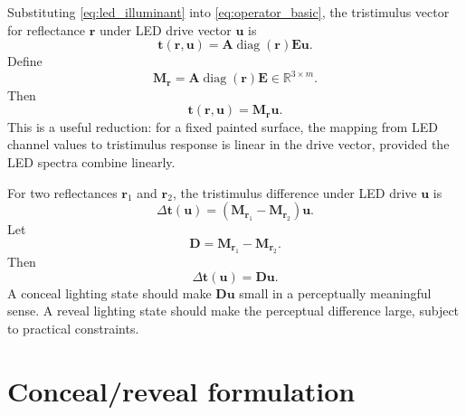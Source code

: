 \documentclass[11pt,a4paper]{article}
\newcommand{\R}{\mathbb{R}}
\newcommand{\diag}{\operatorname{diag}}
\newcommand{\vect}[1]{\boldsymbol{#1}}
\newcommand{\mat}[1]{\mathbf{#1}}
\begin{document}
Substituting \cref{eq:led_illuminant} into \cref{eq:operator_basic}, the tristimulus vector for reflectance $\vect{r}$ under LED drive vector $\vect{u}$ is
\begin{equation}
 \vect{t}(\vect{r},\vect{u})
 =\mat{A}\diag(\vect{r})\mat{E}\vect{u}.
 \label{eq:paint_led_response}
\end{equation}
Define
\begin{equation}
 \mat{M}_{\vect{r}}=\mat{A}\diag(\vect{r})\mat{E}\in\R^{3\times m}.
 \label{eq:paint_response_matrix}
\end{equation}
Then
\begin{equation}
 \vect{t}(\vect{r},\vect{u})=\mat{M}_{\vect{r}}\vect{u}.
 \label{eq:paint_response_linear}
\end{equation}
This is a useful reduction: for a fixed painted surface, the mapping from LED channel values to tristimulus response is linear in the drive vector, provided the LED spectra combine linearly.

For two reflectances $\vect{r}_1$ and $\vect{r}_2$, the tristimulus difference under LED drive $\vect{u}$ is
\begin{equation}
 \Delta\vect{t}(\vect{u})
 =\left(\mat{M}_{\vect{r}_1}-\mat{M}_{\vect{r}_2}\right)\vect{u}.
 \label{eq:D_u}
\end{equation}
Let
\begin{equation}
 \mat{D}=\mat{M}_{\vect{r}_1}-\mat{M}_{\vect{r}_2}.
\end{equation}
Then
\begin{equation}
 \Delta\vect{t}(\vect{u})=\mat{D}\vect{u}.
\end{equation}
A conceal lighting state should make $\mat{D}\vect{u}$ small in a perceptually meaningful sense. A reveal lighting state should make the perceptual difference large, subject to practical constraints.

\section{Conceal/reveal formulation}
\end{document}

